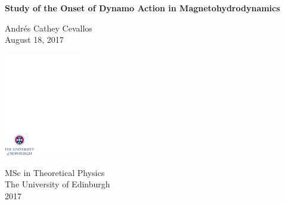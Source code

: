 \documentclass[12pt,a4paper]{report}
\begin{document}
\thispagestyle{empty}

%
\parindent=0pt          %
\parskip=5pt            %
%
%

\vspace*{0.1\textheight}

\begin{center}
        \huge{\bfseries Study of the Onset of Dynamo Action in Magnetohydrodynamics}\\
\end{center}

\bigskip

\begin{center}
        \large{Andr\'es Cathey Cevallos}\\      %
        \bigskip
        \large{August 18, 2017}        %
\end{center}

\vspace*{0.35\textheight}

\begin{center}
        \includegraphics[width=35mm]{crest.pdf}
\end{center}

\medskip

\begin{center}

\large{
  MSc in Theoretical Physics\\[0.8ex]
  The University of Edinburgh\\[0.8ex]
  2017
}

\end{center}
\end{document}
